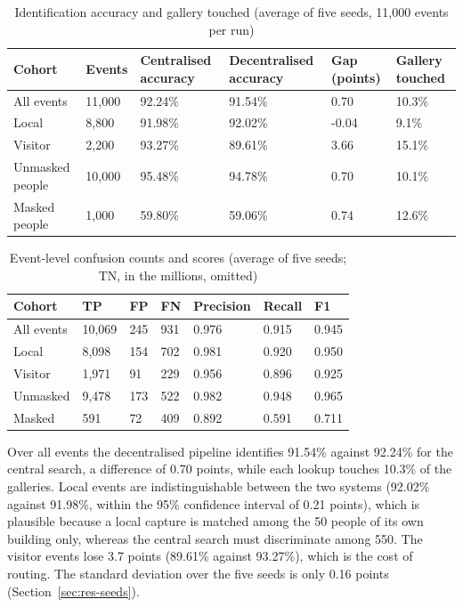 \documentclass[12pt,a4paper,oneside]{report}
\begin{document}
\begin{table}[htbp]
\centering
\caption{Identification accuracy and gallery touched (average of five seeds, 11,000 events per run)}\label{tab:central}
{\small\setlength{\tabcolsep}{4pt}\renewcommand{\arraystretch}{1.2}
\begin{tabular}{|p{2.97cm}|p{1.67cm}|p{2.41cm}|p{2.60cm}|p{1.67cm}|p{2.04cm}|}\hline
\textbf{Cohort} & \textbf{Events} & \textbf{Centralised accuracy} & \textbf{Decentralised accuracy} & \textbf{Gap (points)} & \textbf{Gallery touched}\\\hline
All events & 11,000 & 92.24\% & 91.54\% & 0.70 & 10.3\%\\\hline
Local & 8,800 & 91.98\% & 92.02\% & -0.04 & 9.1\%\\\hline
Visitor & 2,200 & 93.27\% & 89.61\% & 3.66 & 15.1\%\\\hline
Unmasked people & 10,000 & 95.48\% & 94.78\% & 0.70 & 10.1\%\\\hline
Masked people & 1,000 & 59.80\% & 59.06\% & 0.74 & 12.6\%\\\hline
\end{tabular}}
\end{table}



\begin{table}[htbp]
\centering
\caption{Event-level confusion counts and scores (average of five seeds; TN, in the millions, omitted)}\label{tab:events}
{\small\setlength{\tabcolsep}{4pt}\renewcommand{\arraystretch}{1.2}
\begin{tabular}{|p{2.97cm}|p{1.78cm}|p{1.48cm}|p{1.48cm}|p{1.98cm}|p{1.78cm}|p{1.58cm}|}\hline
\textbf{Cohort} & \textbf{TP} & \textbf{FP} & \textbf{FN} & \textbf{Precision} & \textbf{Recall} & \textbf{F1}\\\hline
All events & 10,069 & 245 & 931 & 0.976 & 0.915 & 0.945\\\hline
Local & 8,098 & 154 & 702 & 0.981 & 0.920 & 0.950\\\hline
Visitor & 1,971 & 91 & 229 & 0.956 & 0.896 & 0.925\\\hline
Unmasked & 9,478 & 173 & 522 & 0.982 & 0.948 & 0.965\\\hline
Masked & 591 & 72 & 409 & 0.892 & 0.591 & 0.711\\\hline
\end{tabular}}
\end{table}

Over all events the decentralised pipeline identifies 91.54\% against 92.24\% for the central search, a difference of 0.70 points, while each lookup touches 10.3\% of the galleries. Local events are indistinguishable between the two systems (92.02\% against 91.98\%, within the 95\% confidence interval of 0.21 points), which is plausible because a local capture is matched among the 50 people of its own building only, whereas the central search must discriminate among 550. The visitor events lose 3.7 points (89.61\% against 93.27\%), which is the cost of routing. The standard deviation over the five seeds is only 0.16 points (Section~\ref{sec:res-seeds}).
\end{document}
